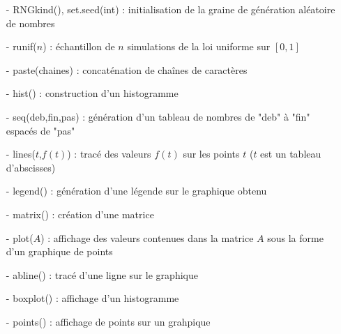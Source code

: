\documentclass{article}
\begin{document}
\begin{itemize}
\item[-] RNGkind(), set.seed(int) : initialisation de la graine de génération aléatoire de nombres
\item[-] runif($n$) : échantillon de $n$ simulations de la loi uniforme sur $[0,1]$
\item[-] paste(chaines) : concaténation de chaînes de caractères 
\item[-] hist() : construction d'un histogramme
\item[-] seq(deb,fin,pas) : génération d'un tableau de nombres de "deb" à "fin" espacés de "pas"
\item[-] lines($t$,$f(t)$) : tracé des valeurs $f(t)$ sur les points $t$ ($t$ est un tableau d'abscisses) 
\item[-] legend() : génération d'une légende sur le graphique obtenu
\item[-] matrix() : création d'une matrice
\item[-] plot($A$) : affichage des valeurs contenues dans la matrice $A$ sous la forme d'un graphique de points
\item[-] abline() : tracé d'une ligne sur le graphique
\item[-] boxplot() : affichage d'un histogramme
\item[-] points() : affichage de points sur un grahpique
\end{itemize}
\end{document}
